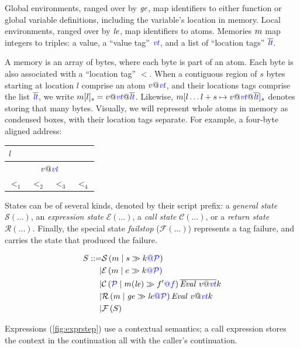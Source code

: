 \documentclass[acmsmall,review,anonymous]{acmart}\settopmatter{printfolios=true,printccs=false,printacmref=false}
\begin{document}
Global environments, ranged over by \(\genv\), map identifiers to either function
or global variable definitions, including the variable's location in memory. Local environments,
ranged over by \(\lenv\), map identifiers to atoms.
Memories \(\mem\) map integers to
triples: a value, a ``value tag'' \(\vt\), and a list of ``location tags'' \(\lts\).

A memory is an array of bytes, where each byte is part of an atom.
Each byte is also associated with a ``location tag'' \(\lt\). When a contiguous region of \(s\) bytes
starting at location \(l\) comprise an atom \(v@\vt\), and their locations tags comprise the list \(\lts\),
we write \(\mem[l]_s = v@\vt @\lts\). Likewise, \(\mem[l \dots l + s \mapsto v@\vt @ \lts]_s\)
denotes storing that many bytes. Visually, we will represent whole atoms in memory as condensed boxes,
with their location tags separate. For example, a four-byte aligned address:

\begin{tabular}{|c|c|c|c|}
  \multicolumn{4}{l}{\(l\)} \\
  \hline
  \multicolumn{4}{|c|}{\(v @ \vt\)} \\
  \hline
  \(\lt_1\) & \(\lt_2\) & \(\lt_3\) & \(\lt_4\) \\
  \hline
\end{tabular}

States can be of several kinds, denoted by their script prefix: a {\em general state} \(\mathcal{S}(\dots)\),
an {\em expression state} \(\mathcal{E}(\dots)\), a {\em call state} \(\mathcal{C}(\dots)\), or a
{\em return state} \(\mathcal{R}(\dots)\). Finally, the special state {\em failstop} (\(\mathcal{F}(\dots)\))
represents a tag failure, and carries the state that produced the failure.

\[\begin{aligned}
S ::= & \sstate{\PCT}{\mem}{\stmt}{\cont} \\
| & \estate{\PCT}{\mem}{\expr}{\cont} \\
| & \cstate{f}{\PCT}{\mem}{\lenv}{f'}{\overline{\val{v}{\vt}}}{\cont} \\
| & \rstate{\PCT}{\mem}{\genv}{\lenv}{\val{v}{\vt}}{\cont} \\
| & \fstate{S} \\
\end{aligned}\]

Expressions (\cref{fig:exprstep}) use a contextual semantics; a call expression stores the
context in the continuation all with the caller's continuation.
\end{document}
